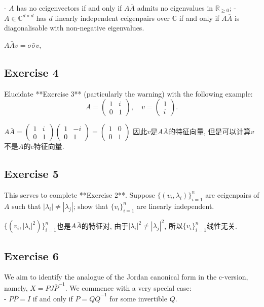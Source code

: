 \documentclass[11pt]{ctexart}
\theoremstyle{definition}
\numberwithin{equation}{section}
\theoremstyle{definition}
\theoremstyle{remark}
\begin{document}
- $A$ has no ceigenvectors if and only if $A \overline A$ admits no eigenvalues in $\mathbb R_{\geq 0}$;
- $A \in \mathbb C^{d \times d}$ has $d$ linearly independent ceigenpairs over $\mathbb C$ if and only if $A\overline A$ is diagonalisable with non-negative eigenvalues.
\begin{aaa}
    $A\bar{A}v=\sigma\bar{\sigma}v$, 
\end{aaa}
\subsection{Exercise 4}
Elucidate **Exercise 3** (particularly the warning) with the following example:
$$
A = \begin{pmatrix} 1 & i \\ 0 & 1 \end{pmatrix},\quad v = \begin{pmatrix}1 \\ i \end{pmatrix}.
$$
\begin{aaa}
    $A\bar{A}=\begin{pmatrix} 1 & i \\ 0 & 1 \end{pmatrix}\begin{pmatrix} 1 & -i \\ 0 & 1 \end{pmatrix} = \begin{pmatrix}
    1&0\\0&1
    \end{pmatrix}$
    因此$v$是$A\bar{A}$的特征向量,
    但是可以计算$v$不是$A$的c特征向量.
\end{aaa}
\subsection{Exercise 5}
This serves to complete **Exercise 2**. Suppose $\{(v_i , \lambda_i)\}_{i=1}^n$ are ceigenpairs of $A$ such that $|\lambda_i| \neq |\lambda_j|$; show that $\{v_i\}_{i=1}^n$ are linearly independent.
\begin{aaa}
    $\{(v_i , |\lambda_i|^2)\}_{i=1}^n$也是$A\bar{A}$的特征对, 由于$|\lambda_i|^2\neq |\lambda_j|^2$, 所以$\{v_i\}_{i=1}^n$线性无关.
\end{aaa}
\subsection{Exercise 6}
We aim to identify the analogue of the Jordan canonical form in the c-version, namely, $X =P J\overline P^{-1}$. We commence with a very special case:
\\- $P\overline {P} = I$ if and only if $P = Q\overline Q^{-1}$ for some invertible $Q$.
\end{document}
